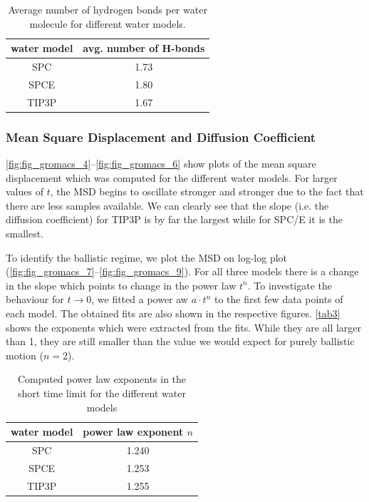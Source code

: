 \documentclass[a4paper,10pt,bibtotoc]{scrartcl}
\begin{document}
\begin{table}[h]
\centering
\caption{Average number of hydrogen bonds per water molecule for different water models.}
\begin{tabular}{@{}cc@{}}
\toprule
water model & avg. number of H-bonds \\ \midrule
SPC         &          1.73                 \\
SPCE        &          1.80               \\
TIP3P       &          1.67                 \\ \bottomrule
\end{tabular}
\label{tab1}
\end{table}

\subsubsection*{Mean Square Displacement and Diffusion Coefficient}
\autoref{fig:fig_gromacs_4}--\autoref{fig:fig_gromacs_6} show plots of the mean square displacement which was computed for the different water models. 
For larger values of $t$, the MSD begins to oscillate stronger and stronger due to the fact that there are less samples available. 
We can clearly see that the slope (i.e. the diffusion coefficient) for TIP3P is by far the largest while for SPC/E it is the smallest.

To identify the ballistic regime, we plot the MSD on log-log plot (\autoref{fig:fig_gromacs_7}--\autoref{fig:fig_gromacs_9}). 
For all three models there is a change in the slope which points to change in the power law $t^n$. 
To investigate the behaviour for $t\rightarrow 0$, we fitted a power aw $a\cdot t^n$ to the first few data points of each model.
The obtained fits are also shown in the respective figures.
\autoref{tab3} shows the exponents which were extracted from the fits.
While they are all larger than 1, they are still smaller than the value we would expect for purely ballistic motion ($n=2$).

\begin{table}[h]
\centering
\caption{Computed power law exponents in the short time limit for the different water models}
\begin{tabular}{@{}cc@{}}
\toprule
water model & power law exponent $n$ \\ \midrule
SPC         & 1.240\\
SPCE        & 1.253\\
TIP3P       & 1.255\\ \bottomrule
\end{tabular}
\label{tab3}
\end{table}
\end{document}
